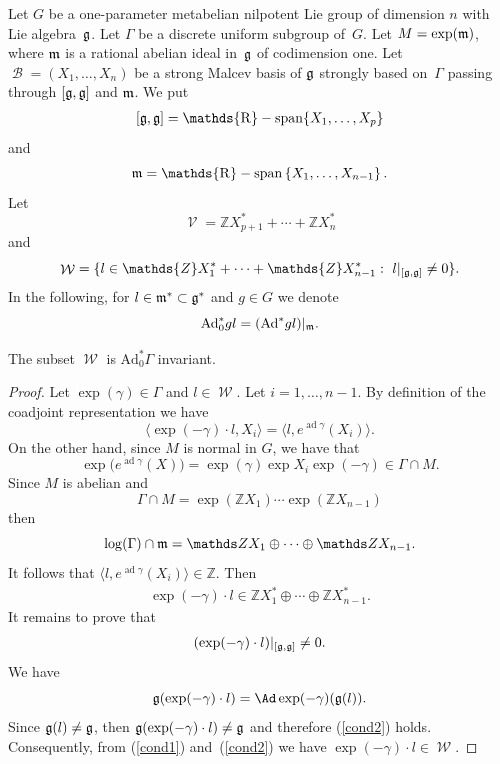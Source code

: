 \documentclass[pdftex]{sigma}
\newcommand{\set}[1]{\left\{#1\right\}}
\DeclareMathOperator{\spann}{\mathds{R}-span}
\DeclareMathOperator{\ad}{ad}
\DeclareMathOperator{\nongen}{\mathcal{V}}
\DeclareMathOperator{\gen}{\mathcal{W}}
\DeclareMathOperator{\bbase}{\mathscr{B}}
\def\dsz{{\mathds Z}}
\begin{document}
Let $G$ be a one-parameter metabelian nilpotent  Lie group  of
dimension $n$ with Lie algebra~$\frak g$.
 Let $\Gamma$ be a discrete uniform
subgroup of~$G$. Let $M = \exp(\frak m)$, where $\frak m$ is  a
rational abelian ideal in~$\frak g$ of codimension one.
 Let  $\bbase = (X_1, \ldots, X_n)$ be a
strong Malcev basis of $\frak g$ strongly based on~$\Gamma$ passing
through $[\frak g, \frak g]$ and $\frak m$. We put
\begin{gather}\label{alg-derivee}
[\frak g, \frak g] = \spann\lbrace X_1,\ldots, X_p\rbrace
\end{gather}
and
\[
\frak m
=\spann\set{X_1, \ldots, X_{n-1}}.
\]
  Let
\[
\nongen = \mathds{Z} X_{p+1}^*+\cdots+\mathds{Z}X_{n}^*
\]
and
\[
\gen= \{ l \in
\mathds{Z}X_1^*+\cdots +\mathds{Z}X_{n-1}^*:\ l\vert_{[\frak g,
\frak g]}\ne 0\}.
\]
 In the following, for $l \in \frak m^* \subset \frak g^*$ and $g
\in G$ we denote
\[
 \mathrm{Ad}_0^*g l =(\mathrm{Ad}^* g l)\vert_{\frak m}.
 \]


\begin{lemma}
 The subset $\gen$ is $  \mathrm{Ad}_0^* \Gamma$ invariant.
\end{lemma}
\begin{proof}
Let $\exp(\gamma) \in \Gamma$ and $l \in \gen$. Let $i=1, \ldots,
n-1$. By def\/inition of the coadjoint representation we have
\[
\langle \exp(-\gamma)\cdot l, X_i\rangle = \langle l, e^{\ad
\gamma}(X_i)\rangle.
\]
 On the other hand, since $M$ is normal in
$G$,  we have  that
\[
\exp\big(e^{\ad
\gamma}(X)\big) = \exp(\gamma) \exp{X_i} \exp(-\gamma) \in \Gamma \cap
M.
\] Since $M$ is abelian and
\[
\Gamma \cap M=\exp(\dsz X_1)\cdots
\exp(\dsz X_{n-1})
\] then
\[
\log(\Gamma) \cap \frak m=\dsz X_1\oplus\cdots\oplus \dsz
X_{n-1}.
\] It follows that  $\langle l, e^{\ad \gamma}(X_i)\rangle
\in \dsz$. Then
\begin{gather}\label{cond1}
\exp(-\gamma)\cdot l\in
\dsz X_1^*\oplus\cdots\oplus \dsz X_{n-1}^*.
\end{gather}
It remains to prove that
\begin{gather}\label{cond2}
(\exp(-\gamma)\cdot l)\vert_{[\frak g, \frak g]}\ne 0.
\end{gather}
We have
\[
\frak g(\exp(-\gamma)\cdot l)=\Ad\exp(-\gamma)(\frak g(l)).
\]
Since $\frak g(l)\ne \frak g$, then $\frak g(\exp(-\gamma)\cdot
l)\ne \frak g$ and therefore (\ref{cond2}) holds. Consequently, from
(\ref{cond1}) and~(\ref{cond2}) we have $\exp(-\gamma)\cdot l \in
\gen$.
\end{proof}
\end{document}
